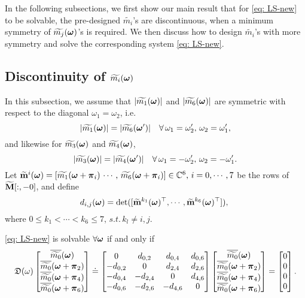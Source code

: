 In the following subsections, we first show our main result that for \eqref{eq: LS-new} to be solvable, the pre-designed $\widetilde{m_i}$'s are discontinuous, when a minimum symmetry of $\widetilde{m_{j}}(\boldsymbol{\omega})$'s is required. We then discuss how to design $\widetilde{m_i}$'s with more symmetry and solve the corresponding system \eqref{eq: LS-new}.

\subsection{Discontinuity of $\widetilde{m_{i}}(\boldsymbol{\omega})$}
In this subsection, we assume that
$|\widetilde{m_{1}}(\boldsymbol{\omega})|$ and $|\widetilde{m_{6}}(\boldsymbol{\omega})|$ are symmetric with respect to the diagonal $\omega_1=\omega_2$, i.e.
$$ |\widetilde{m_1}(\boldsymbol{\omega})| = |\widetilde{m_6}(\boldsymbol{\omega}')|\quad \forall\, \omega_1=\omega_2', \,\omega_2=\omega_1',$$
and likewise for $\widetilde{m_{3}}(\boldsymbol{\omega})$ and $\widetilde{m_{4}}(\boldsymbol{\omega})$,
$$ |\widetilde{m_3}(\boldsymbol{\omega})| = |\widetilde{m_4}(\boldsymbol{\omega}')|\quad \forall\, \omega_1=-\omega_2', \,\omega_2=-\omega_1'.$$
Let $\widetilde{\mathbf{m}}^{i}(\boldsymbol{\omega}) = [\widetilde{m_1}(\boldsymbol{\omega}+\boldsymbol{\pi}_i)\, \cdots,\,\widetilde{m_6}(\boldsymbol{\omega}+\boldsymbol{\pi}_i)]\in\mathbb{C}^6,\, i = 0,\cdots,7$ be the rows of $\widetilde{\mathbf{M}}[:,-0]$, and define $$d_{i,j}(\boldsymbol{\omega}) = \det([\widetilde{\mathbf{m}}^{k_1}(\boldsymbol{\omega})^\top,\cdots,\widetilde{\mathbf{m}}^{k_6}(\boldsymbol{\omega})^\top]),\;$$ where $0\leq k_1<\cdots<k_6\leq 7,\, s.t.\, k_l\neq i,j.$
\begin{lemma}\label{lem: subM-singular-sys}
\eqref{eq: LS-new} is solvable $\forall \boldsymbol{\omega}$ if and only if \vspace{.5em}
\begin{align}
\label{eq: singular-cond}
\mathfrak{D}(\omega)\begin{bmatrix}
\overline{\widetilde{m_{0}}}(\boldsymbol{\omega})\\
\overline{\widetilde{m_{0}}}(\boldsymbol{\omega} + \boldsymbol{\pi}_{2})\\
\overline{\widetilde{m_{0}}}(\boldsymbol{\omega} + \boldsymbol{\pi}_{4})\\
\overline{\widetilde{m_{0}}}(\boldsymbol{\omega} + \boldsymbol{\pi}_{6})
\end{bmatrix}
\doteq
\begin{bmatrix}
0 & d_{0,2} & d_{0,4} & d_{0,6}\\
-d_{0,2} & 0 & d_{2,4} & d_{2,6}\\
-d_{0,4} & -d_{2,4} & 0 & d_{4,6}\\
-d_{0,6} & -d_{2,6} & -d_{4,6} & 0
\end{bmatrix}
\begin{bmatrix}
\overline{\widetilde{m_{0}}}(\boldsymbol{\omega})\\
\overline{\widetilde{m_{0}}}(\boldsymbol{\omega} + \boldsymbol{\pi}_{2})\\
\overline{\widetilde{m_{0}}}(\boldsymbol{\omega} + \boldsymbol{\pi}_{4})\\
\overline{\widetilde{m_{0}}}(\boldsymbol{\omega} + \boldsymbol{\pi}_{6})
\end{bmatrix}
= \begin{bmatrix}
0\\0\\0\\0
\end{bmatrix}.
\end{align}
\end{lemma}
